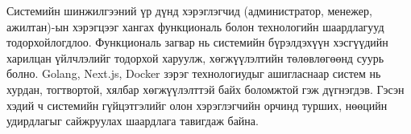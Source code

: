 Системийн шинжилгээний үр дүнд хэрэглэгчид (администратор, менежер, ажилтан)-ын хэрэгцээг хангах функциональ болон технологийн шаардлагууд тодорхойлогдлоо. Функциональ загвар нь системийн бүрэлдэхүүн хэсгүүдийн харилцан үйлчлэлийг тодорхой харуулж, хөгжүүлэлтийн төлөвлөгөөнд суурь болно. Golang, Next.js, Docker зэрэг технологиудыг ашигласнаар систем нь хурдан, тогтвортой, хялбар хөгжүүлэлттэй байх боломжтой гэж дүгнэгдэв. Гэсэн хэдий ч системийн гүйцэтгэлийг олон хэрэглэгчийн орчинд турших, нөөцийн удирдлагыг сайжруулах шаардлага тавигдаж байна.